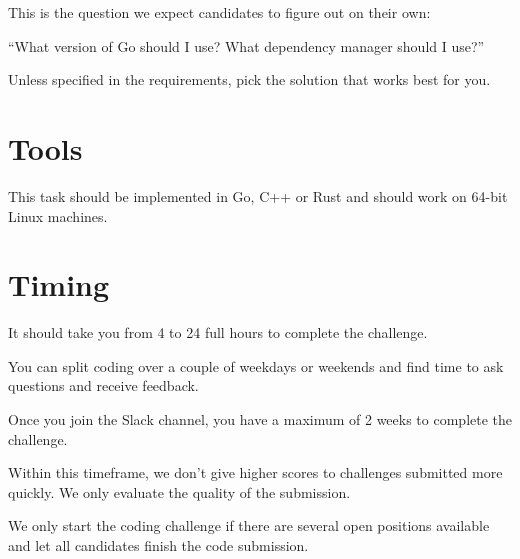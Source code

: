 \documentclass{article}
\begin{document}
This is the question we expect candidates to figure out on their own:

``What version of Go should I use? What dependency manager should I use?''

Unless specified in the requirements, pick the solution that works best for you.

\section{Tools}

This task should be implemented in Go, C++ or Rust and should work on 64-bit Linux machines.

\section{Timing}

It should take you from 4 to 24 full hours to complete the challenge.

You can split coding over a couple of weekdays or weekends and find time to ask questions and receive feedback.

Once you join the Slack channel, you have a maximum of 2 weeks to complete the challenge.

Within this timeframe, we don't give higher scores to challenges submitted more quickly.
We only evaluate the quality of the submission.

We only start the coding challenge if there are several open positions available and let
all candidates finish the code submission.
\end{document}
